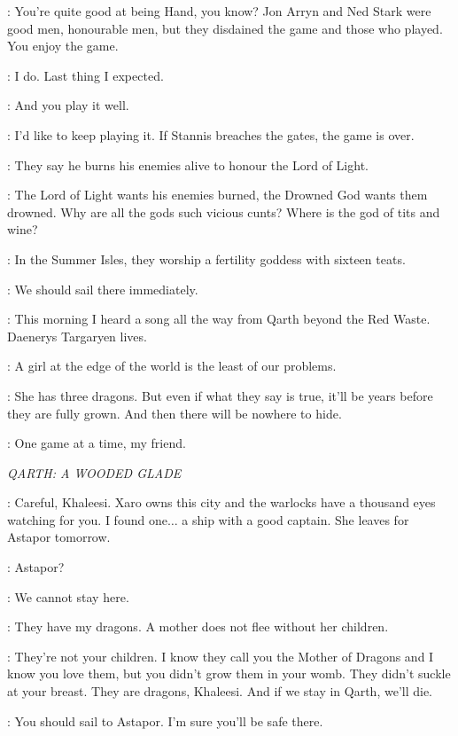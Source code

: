 \VARYS: You're quite good at being Hand, you know? Jon Arryn and Ned Stark were good men, honourable men, but they disdained the game and those who played. You enjoy the game. 

\TYRION: I do. Last thing I expected. 

\VARYS: And you play it well. 

\TYRION: I'd like to keep playing it. If Stannis breaches the gates, the game is over. 

\VARYS: They say he burns his enemies alive to honour the Lord of Light. 

\TYRION: The Lord of Light wants his enemies burned, the Drowned God wants them drowned. Why are all the gods such vicious cunts? Where is the god of tits and wine? 

\VARYS: In the Summer Isles, they worship a fertility goddess with sixteen teats. 

\TYRION: We should sail there immediately. 

\VARYS: This morning I heard a song all the way from Qarth beyond the Red Waste. Daenerys Targaryen lives. 

\TYRION: A girl at the edge of the world is the least of our problems. 

\VARYS: She has three dragons. But even if what they say is true, it'll be years before they are fully grown. And then there will be nowhere to hide. 

\TYRION: One game at a time, my friend. 


\scene

\textit{QARTH: A WOODED GLADE} 


\JORAH: Careful, Khaleesi. Xaro owns this city and the warlocks have a thousand eyes watching for you. I found one$\ldots$ a ship with a good captain. She leaves for Astapor tomorrow. 

\DAENERYS: Astapor? 

\JORAH: We cannot stay here. 

\DAENERYS: They have my dragons. A mother does not flee without her children. 

\JORAH: They're not your children. I know they call you the Mother of Dragons and I know you love them, but you didn't grow them in your womb. They didn't suckle at your breast. They are dragons, Khaleesi. And if we stay in Qarth, we'll die. 

\DAENERYS: You should sail to Astapor. I'm sure you'll be safe there. 

